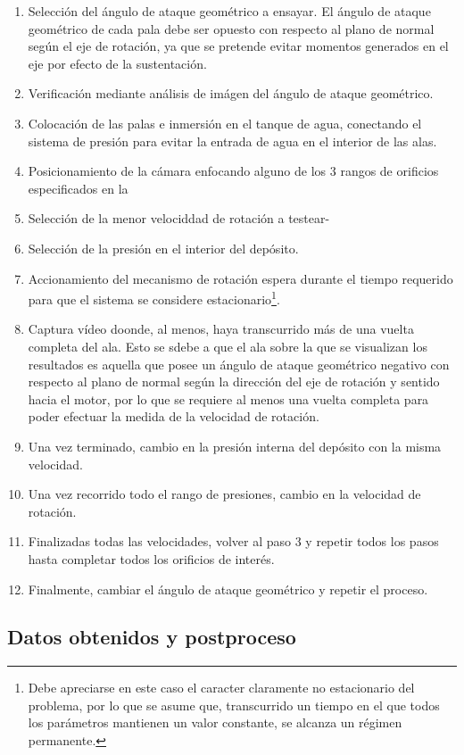 \begin{enumerate}
\item Selección del ángulo de ataque geométrico a ensayar. El ángulo de ataque geométrico de cada pala debe ser opuesto con respecto al plano de normal según el eje de rotación, ya que se pretende evitar momentos generados en el eje por efecto de la sustentación. 
\item Verificación mediante análisis de imágen del ángulo de ataque geométrico.
\item Colocación de las palas e inmersión en el tanque de agua, conectando el sistema de presión para evitar la entrada de agua en el interior de las alas. 
\item Posicionamiento de la cámara enfocando alguno de los 3 rangos de orificios especificados en la 
\item Selección de la menor velociddad de rotación a testear-
\item Selección de la presión en el interior del depósito.
\item Accionamiento del mecanismo de rotación espera durante el tiempo requerido para que el sistema se considere estacionario\footnote{Debe apreciarse en este caso el caracter claramente no estacionario del problema, por lo que se asume que, transcurrido un tiempo en el que todos los parámetros mantienen un valor constante, se alcanza un régimen permanente.}. 
\item Captura vídeo doonde, al menos, haya transcurrido más de una vuelta completa del ala. Esto se sdebe a que el ala sobre la que se visualizan los resultados es aquella que posee un ángulo de ataque geométrico negativo con respecto al  plano de normal según la dirección del eje de rotación y sentido hacia el motor, por lo que se requiere al menos una vuelta completa para poder efectuar la medida de la velocidad de rotación. 
\item Una vez terminado, cambio en la presión interna del depósito con la misma velocidad.
\item Una vez recorrido todo el rango de presiones, cambio en la velocidad de rotación.
\item Finalizadas todas las velocidades, volver al paso 3 y repetir todos los pasos hasta completar todos los orificios de interés. 
\item Finalmente, cambiar el ángulo de ataque geométrico y repetir el proceso. 
\end{enumerate}


\subsection{Datos obtenidos y postproceso}

